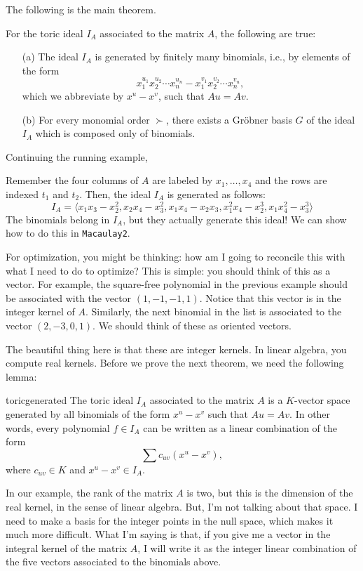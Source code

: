 The following is the main theorem.
\begin{theorem}{}{}
For the toric ideal $I_A$ associated to the matrix $A$, the following are true:
\begin{enumerate}
\item[(a)] The ideal $I_A$ is generated by finitely many binomials, i.e., by elements of the form
\[ x_1^{u_1}x_2^{u_2} \cdots x_n^{u_n} - x_1^{v_1}x_2^{v_2} \cdots x_n^{v_n}, \]
which we abbreviate by $x^u - x^v$, such that $Au = Av$.
\item[(b)] For every monomial order $\succ$, there exists a Gr\"obner basis $G$ of the ideal $I_A$ which is composed only of binomials.
\end{enumerate}
\end{theorem}

Continuing the running example,
\begin{example}
Remember the four columns of $A$ are labeled by $x_1,\ldots, x_4$ and the rows are indexed $t_1$ and $t_2$. Then, the ideal $I_A$ is generated as follows:
\[ I_A = \langle x_1x_3 - x_2^2 , x_2x_4 - x_3^2, x_1x_4 - x_2x_3, x_1^2x_4 -x_2^3, x_1x_4^2 - x_3^3 \rangle\]
The binomials belong in $I_A$, but they actually generate this ideal! We can show how to do this in {\tt Macaulay2}.
\end{example}
For optimization, you might be thinking: how am I going to reconcile this with what I need to do to optimize? This is simple: you should think of this as a vector. For example, the square-free polynomial in the previous example should be associated with the vector $(1,-1,-1,1)$. Notice that this vector is in the integer kernel of $A$. Similarly, the next binomial in the list is associated to the vector $(2,-3,0,1)$. We should think of these as oriented vectors.

The beautiful thing here is that these are integer kernels. In linear algebra, you compute real kernels. Before we prove the next theorem, we need the following lemma:
\begin{lemma}{}{toricgenerated}\label{lemma:toricgenerated}
The toric ideal $I_A$ associated to the matrix $A$ is a $K$-vector space generated by all binomials of the form $x^u - x^v$ such that $Au = Av$. In other words, every polynomial $f \in I_A$ can be written as a linear combination of the form
\begin{equation}\label{equation:happyface}
\sum c_{uv}(x^u - x^v),
\end{equation}
where $c_{uv} \in K$ and $x^u - x^v \in I_A$.
\end{lemma}
In our example, the rank of the matrix $A$ is two, but this is the dimension of the real kernel, in the sense of linear algebra. But, I'm not talking about that space. I need to make a basis for the integer points in the null space, which makes it much more difficult. What I'm saying is that, if you give me a vector in the integral kernel of the matrix $A$, I will write it as the integer linear combination of the five vectors associated to the binomials above.

